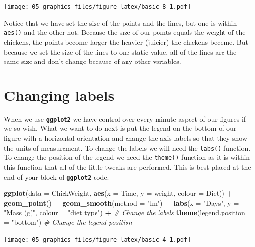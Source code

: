 \documentclass[
]{book}
\newenvironment{Shaded}{\begin{snugshade}}{\end{snugshade}}
\newcommand{\CommentTok}[1]{\textcolor[rgb]{0.56,0.35,0.01}{\textit{#1}}}
\newcommand{\DataTypeTok}[1]{\textcolor[rgb]{0.13,0.29,0.53}{#1}}
\newcommand{\KeywordTok}[1]{\textcolor[rgb]{0.13,0.29,0.53}{\textbf{#1}}}
\newcommand{\NormalTok}[1]{#1}
\newcommand{\OperatorTok}[1]{\textcolor[rgb]{0.81,0.36,0.00}{\textbf{#1}}}
\newcommand{\StringTok}[1]{\textcolor[rgb]{0.31,0.60,0.02}{#1}}
\begin{document}
\texttt{[image: 05-graphics\_files/figure-latex/basic-8-1.pdf]}

Notice that we have set the size of the points and the lines, but one is within \texttt{aes()} and the other not. Because the size of our points equals the weight of the chickens, the points become larger the heavier (juicier) the chickens become. But because we set the size of the lines to one static value, all of the lines are the same size and don't change because of any other variables.

\hypertarget{changing-labels}{%
\section{Changing labels}\label{changing-labels}}

When we use \textbf{\texttt{ggplot2}} we have control over every minute aspect of our figures if we so wish. What we want to do next is put the legend on the bottom of our figure with a horizontal orientation and change the axis labels so that they show the units of measurement. To change the labels we will need the \texttt{labs()} function. To change the position of the legend we need the \texttt{theme()} function as it is within this function that all of the little tweaks are performed. This is best placed at the end of your block of \textbf{\texttt{ggplot2}} code.

\begin{Shaded}
\begin{Highlighting}[]
\KeywordTok{ggplot}\NormalTok{(}\DataTypeTok{data =}\NormalTok{ ChickWeight, }\KeywordTok{aes}\NormalTok{(}\DataTypeTok{x =}\NormalTok{ Time, }\DataTypeTok{y =}\NormalTok{ weight, }\DataTypeTok{colour =}\NormalTok{ Diet)) }\OperatorTok{+}
\StringTok{  }\KeywordTok{geom\_point}\NormalTok{() }\OperatorTok{+}
\StringTok{  }\KeywordTok{geom\_smooth}\NormalTok{(}\DataTypeTok{method =} \StringTok{"lm"}\NormalTok{) }\OperatorTok{+}
\StringTok{  }\KeywordTok{labs}\NormalTok{(}\DataTypeTok{x =} \StringTok{"Days"}\NormalTok{, }\DataTypeTok{y =} \StringTok{"Mass (g)"}\NormalTok{, }\DataTypeTok{colour =} \StringTok{"diet type"}\NormalTok{) }\OperatorTok{+}\StringTok{ }\CommentTok{\# Change the labels}
\StringTok{  }\KeywordTok{theme}\NormalTok{(}\DataTypeTok{legend.position =} \StringTok{"bottom"}\NormalTok{) }\CommentTok{\# Change the legend position}
\end{Highlighting}
\end{Shaded}

\texttt{[image: 05-graphics\_files/figure-latex/basic-4-1.pdf]}
\end{document}
